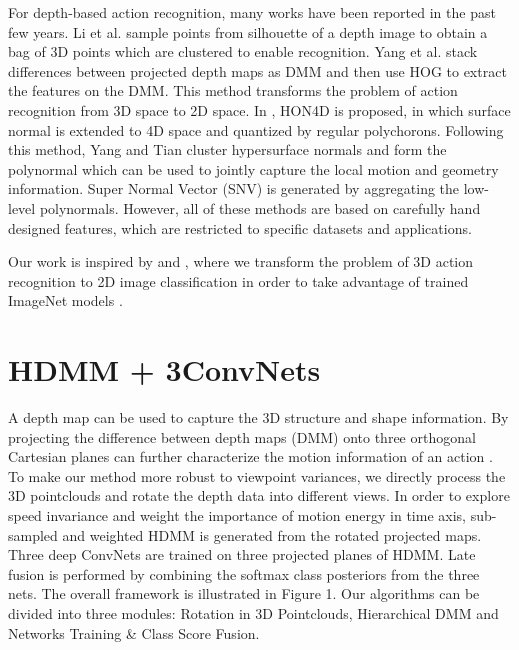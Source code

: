 \documentclass[conference]{IEEEtran}
\begin{document}
For depth-based action recognition, many works have been reported in the past few years. Li et al. \cite{Li2010} sample points from silhouette of a depth image to obtain a bag of 3D points which are clustered to enable recognition. Yang et al. \cite{Yang2012a} stack differences between projected depth maps as DMM and then use HOG to extract the features on the DMM. This method transforms the problem of action recognition from 3D space to 2D space. In \cite{Oreifej2013}, HON4D is proposed, in which surface normal is extended to 4D space and quantized by regular polychorons. Following this method, Yang and Tian \cite{yangsuper} cluster hypersurface normals and form the polynormal which can be used to jointly capture the local motion and geometry information. Super Normal Vector (SNV) is generated by aggregating the low-level polynormals. However, all of these methods are based on carefully hand designed features, which are restricted to specific datasets and applications.

Our work is inspired by \cite{Yang2012a} and \cite{simonyan2014two}, where we transform the problem of 3D action recognition to 2D image classification in order to take advantage of trained ImageNet models \cite{krizhevsky2012imagenet}.


\section{HDMM + 3ConvNets}
A depth map can be used to capture the 3D structure and shape information. By projecting the difference between depth maps (DMM) onto three orthogonal Cartesian planes can further characterize the motion information of an action \cite{Yang2012a}. To make our method more robust to viewpoint variances, we directly process the 3D pointclouds and rotate the depth data into different views. In order to explore speed invariance and weight the importance of motion energy in time axis, sub-sampled and weighted HDMM is generated from the rotated projected maps. Three deep ConvNets are trained on three projected planes of HDMM. Late fusion is performed by combining the softmax class posteriors from the three nets. The overall framework is illustrated in Figure 1. Our algorithms can be divided into three modules: Rotation in 3D Pointclouds, Hierarchical DMM and Networks Training \& Class Score Fusion.
\end{document}
